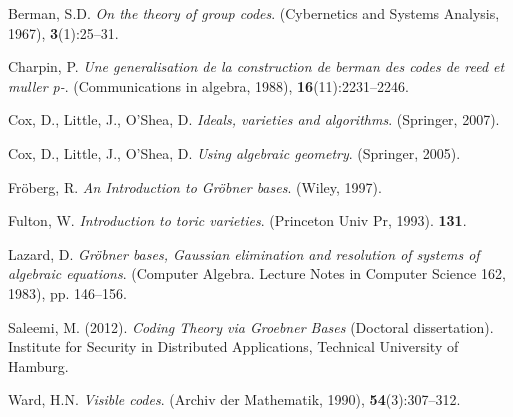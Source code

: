 \documentclass[english,bachelor]{liumaiex}
\begin{document}
\begin{thebibliography}{99}
Berman, S.D. \emph{On the theory of group codes}. (Cybernetics and Systems Analysis, 1967), \textbf{3}(1):25–31.

Charpin, P. \emph{Une generalisation de la construction de berman des codes
de reed et muller p-}. (Communications in algebra, 1988), \textbf{16}(11):2231–2246.

Cox, D., Little, J., O'Shea, D. \emph{Ideals, varieties and algorithms}. (Springer, 2007).

Cox, D., Little, J., O'Shea, D. \emph{Using algebraic geometry}. (Springer, 2005).

Fröberg, R. \emph{An Introduction to Gröbner bases}. (Wiley, 1997).

Fulton, W. \emph{Introduction to toric varieties}. (Princeton Univ Pr, 1993). \textbf{131}.

Lazard, D. \emph{Gröbner bases, Gaussian elimination and resolution of systems of algebraic equations}. (Computer Algebra. Lecture Notes in Computer Science 162, 1983), pp. 146–156.

Saleemi, M. (2012). \emph{Coding Theory via Groebner Bases} (Doctoral dissertation). Institute for Security in Distributed Applications, Technical University of Hamburg.

Ward, H.N. \emph{Visible codes}. (Archiv der Mathematik, 1990), \textbf{54}(3):307–312.
\end{thebibliography}
\printindex
\end{document}
